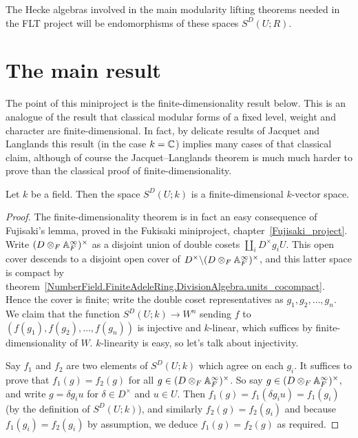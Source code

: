 The Hecke algebras involved in the main modularity lifting
theorems needed in the FLT project will be endomorphisms of these spaces $S^D(U;R)$.

\section{The main result}

The point of this miniproject is the finite-dimensionality result below.
This is an analogue of the result that classical modular forms of a fixed
level, weight and character are finite-dimensional. In fact, by delicate results
of Jacquet and Langlands this result (in the case $k=\mathbb{C}$) implies many cases of that classical claim,
although of course the Jacquet--Langlands theorem is much much harder to prove than the classical
proof of finite-dimensionality.


\begin{theorem}
  \label{TotallyDefiniteQuaternionAlgebra.WeightTwoAutomorphicForm.finiteDimensional}
  Let $k$ be a field. Then the space $S^D(U;k)$ is a finite-dimensional $k$-vector space.
\end{theorem}



\begin{proof}
  The finite-dimensionality theorem is in fact an easy consequence of Fujisaki's lemma,
  proved in the Fukisaki miniproject, chapter~\ref{Fujisaki_project}.
  Write $(D\otimes_F\mathbb{A}_F^\infty)^\times$ as a disjoint union of double cosets
  $\coprod_i D^\times g_i U$. This open cover descends to a disjoint open
  cover of $D^\times\backslash (D\otimes_F\mathbb{A}_F^\infty)^\times$,
  and this latter space is compact by theorem~\ref{NumberField.FiniteAdeleRing.DivisionAlgebra.units_cocompact}.
  Hence the cover is finite; write the double coset representatives
  as $g_1,g_2,\ldots,g_n$. We claim that
  the function $S^D(U;k)\to W^n$ sending $f$ to $(f(g_1),f(g_2),\ldots,f(g_n))$
  is injective and $k$-linear, which suffices by finite-dimensionality of $W$.
  $k$-linearity is easy, so let's talk about injectivity.

  Say $f_1$ and $f_2$ are two elements of $S^D(U;k)$ which agree on
  each $g_i$. It suffices to prove that $f_1(g)=f_2(g)$ for all
  $g\in(D\otimes_F\mathbb{A}_F^\infty)^\times$. So say $g\in(D\otimes_F\mathbb{A}_F^\infty)^\times$,
  and write $g=\delta g_iu$ for $\delta \in D^\times$ and $u\in U$.
  Then $f_1(g)=f_1(\delta g_iu)=f_1(g_i)$ (by the definition of $S^D(U;k)$), and similarly $f_2(g)=f_2(g_i)$
  and because $f_1(g_i)=f_2(g_i)$ by assumption, we deduce $f_1(g)=f_2(g)$ as required.
\end{proof}
